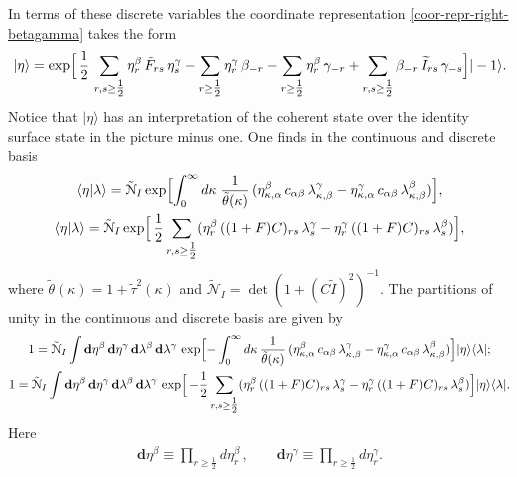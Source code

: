 \documentclass[a4paper,12pt]{article}
\newcommand{\Nc}{\mathcal{N}}
\begin{document}
In terms of these discrete variables the coordinate representation
\eqref{coor-repr-right-betagamma} takes the form
\begin{gather}
|\eta\rangle=\exp\Bigl[
\,\frac12\,\sum_{r,s\geq\tfrac12}\eta^{\beta}_r\,\tilde{F}_{rs}\,\eta^{\gamma}_s
-\sum_{r\geq\tfrac12}\eta^{\gamma}_r\,\beta_{-r}
-\sum_{r\geq\tfrac12}\eta^{\beta}_r\,\gamma_{-r}
+\sum_{r,s\geq\tfrac12}\beta_{-r}\,\widetilde{I}_{rs}\,\gamma_{-s}
\Bigr]|-1\rangle.
\end{gather}
Notice that $|\eta\rangle$
has an interpretation of the coherent state over
the identity surface state in the picture minus one.
One finds in the continuous and discrete basis
\begin{subequations}
\begin{gather}
\langle \eta|\lambda\rangle
=\tilde{\Nc}_{I}
\exp\Bigl[\int_{0}^{\infty}d\kappa\; \frac{1}{\tilde{\theta}(\kappa)}\,
(\eta^{\beta}_{\kappa,\alpha}\,c_{\alpha\beta}\,
\lambda^{\gamma}_{\kappa,\beta}
-\eta^{\gamma}_{\kappa,\alpha}\,c_{\alpha\beta}\,
\lambda^{\beta}_{\kappa,\beta})\Bigr],\\
\langle \eta|\lambda\rangle=\tilde{\Nc}_{I}
\exp\Bigl[\,\frac12\sum_{r,s\geq\tfrac12}
(\eta^{\beta}_{r}\,((1+F)C)_{rs}\,\lambda^{\gamma}_{s}
-\eta^{\gamma}_{r}\,((1+F)C)_{rs}\,\lambda^{\beta}_{s}
)\Bigr],
\end{gather}
\end{subequations}
where $\tilde{\theta}(\kappa)=1+\tilde{\tau}^2(\kappa)$
and $\tilde{\Nc}_{I}=\det(1+(C\tilde{I})^2)^{-1}$.
The partitions of unity in the continuous and discrete basis are given by
\begin{subequations}
\begin{gather}
1=\tilde{\Nc}_{I}\int \mathbf{d}\eta^{\beta}\,\mathbf{d}\eta^{\gamma}\,
 \mathbf{d}\lambda^{\beta}\,\mathbf{d}\lambda^{\gamma}\,
\exp\Bigl[-\int_{0}^{\infty}d\kappa\,\frac{1}{\tilde{\theta}(\kappa)}\,
(\eta^{\beta}_{\kappa,\alpha}\,c_{\alpha\beta}\,
\lambda^{\gamma}_{\kappa,\beta}
-\eta^{\gamma}_{\kappa,\alpha}\,c_{\alpha\beta}\,
\lambda^{\beta}_{\kappa,\beta})\Bigr]
|\eta\rangle\langle\lambda|;\\
1=\tilde{\Nc}_{I}\int \mathbf{d}\eta^{\beta}\,\mathbf{d}\eta^{\gamma}\,
\mathbf{d}\lambda^{\beta}\,\mathbf{d}\lambda^{\gamma}\,
\exp\Bigl[\,-\frac12\sum_{r,s\geq\tfrac12}
(\eta^{\beta}_{r}\,((1+F)C)_{rs}\,\lambda^{\gamma}_{s}
-\eta^{\gamma}_{r}\,((1+F)C)_{rs}\,\lambda^{\beta}_{s}
)\Bigr]|\eta\rangle\langle\lambda|.
\end{gather}
\label{edinitsa-betagamma}
\end{subequations}
Here
\begin{gather}
\mathbf{d}\eta^{\beta}\equiv\prod_{r\geq\tfrac12}
d\eta^{\beta}_{r}\,,\qquad
\mathbf{d}\eta^{\gamma}\equiv\prod_{r\geq\tfrac12}
d\eta^{\gamma}_{r}.
\end{gather}
\end{document}
